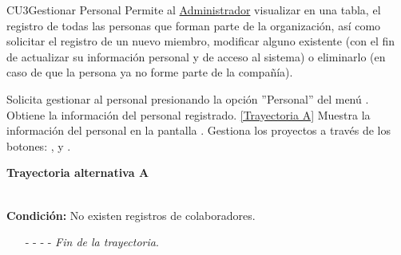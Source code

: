 	\begin{UseCase}{CU3}{Gestionar Personal}{
		Permite al {\hyperlink{admin}{Administrador} visualizar en una tabla, el registro de todas las personas que forman parte de la organización, así como solicitar el registro de un nuevo miembro, modificar alguno existente (con el fin de actualizar su información personal y de acceso al sistema) o eliminarlo (en caso de que la persona ya no forme parte de la compañía).\\}
	}
\end{UseCase}
\begin{UCtrayectoria}
	\UCpaso[\UCactor] Solicita gestionar al personal presionando la opción ''Personal'' del menú .
	\UCpaso[\UCsist] Obtiene la información del personal registrado. \hyperlink{CU3:TAA}{[Trayectoria A]}
	\UCpaso[\UCsist] Muestra la información del personal en la pantalla .
	\UCpaso[\UCactor] Gestiona los proyectos a través de los botones: , \editar  y \eliminar. \label{CU3-P4}
\end{UCtrayectoria}		
\hypertarget{CU3:TAA}{\textbf{Trayectoria alternativa A}}\\
\noindent \textbf{Condición:} No existen registros de colaboradores.
\begin{enumerate}
	\UCpaso[\UCsist] Muestra el mensaje  en la pantalla  para indicar que no hay registros de colaboradores para mostrar.
	\item[- -] - - {\em {Fin de la trayectoria}}.%
\end{enumerate}

